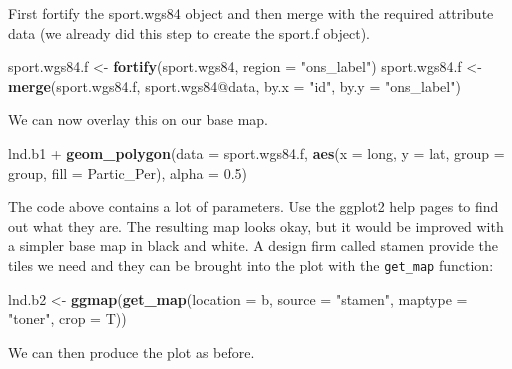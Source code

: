 \documentclass[]{article}
\newenvironment{Shaded}{}{}
\newcommand{\KeywordTok}[1]{\textcolor[rgb]{0.00,0.44,0.13}{\textbf{{#1}}}}
\newcommand{\DataTypeTok}[1]{\textcolor[rgb]{0.56,0.13,0.00}{{#1}}}
\newcommand{\FloatTok}[1]{\textcolor[rgb]{0.25,0.63,0.44}{{#1}}}
\newcommand{\StringTok}[1]{\textcolor[rgb]{0.25,0.44,0.63}{{#1}}}
\newcommand{\NormalTok}[1]{{#1}}
\begin{document}
First fortify the sport.wgs84 object and then merge with the required
attribute data (we already did this step to create the sport.f object).

\begin{Shaded}
\begin{Highlighting}[]
\NormalTok{sport.wgs84.f <- }\KeywordTok{fortify}\NormalTok{(sport.wgs84, }\DataTypeTok{region =} \StringTok{"ons_label"}\NormalTok{)}
\NormalTok{sport.wgs84.f <- }\KeywordTok{merge}\NormalTok{(sport.wgs84.f, sport.wgs84@data, }\DataTypeTok{by.x =} \StringTok{"id"}\NormalTok{, }\DataTypeTok{by.y =} \StringTok{"ons_label"}\NormalTok{)}
\end{Highlighting}
\end{Shaded}
We can now overlay this on our base map.

\begin{Shaded}
\begin{Highlighting}[]
\NormalTok{lnd.b1 + }\KeywordTok{geom_polygon}\NormalTok{(}\DataTypeTok{data =} \NormalTok{sport.wgs84.f, }\KeywordTok{aes}\NormalTok{(}\DataTypeTok{x =} \NormalTok{long, }\DataTypeTok{y =} \NormalTok{lat, }\DataTypeTok{group =} \NormalTok{group, }
    \DataTypeTok{fill =} \NormalTok{Partic_Per), }\DataTypeTok{alpha =} \FloatTok{0.5}\NormalTok{)}
\end{Highlighting}
\end{Shaded}
The code above contains a lot of parameters. Use the ggplot2 help pages
to find out what they are. The resulting map looks okay, but it would be
improved with a simpler base map in black and white. A design firm
called stamen provide the tiles we need and they can be brought into the
plot with the \texttt{get\_map} function:

\begin{Shaded}
\begin{Highlighting}[]
\NormalTok{lnd.b2 <- }\KeywordTok{ggmap}\NormalTok{(}\KeywordTok{get_map}\NormalTok{(}\DataTypeTok{location =} \NormalTok{b, }\DataTypeTok{source =} \StringTok{"stamen"}\NormalTok{, }\DataTypeTok{maptype =} \StringTok{"toner"}\NormalTok{, }
    \DataTypeTok{crop =} \NormalTok{T))}
\end{Highlighting}
\end{Shaded}
We can then produce the plot as before.
\end{document}
